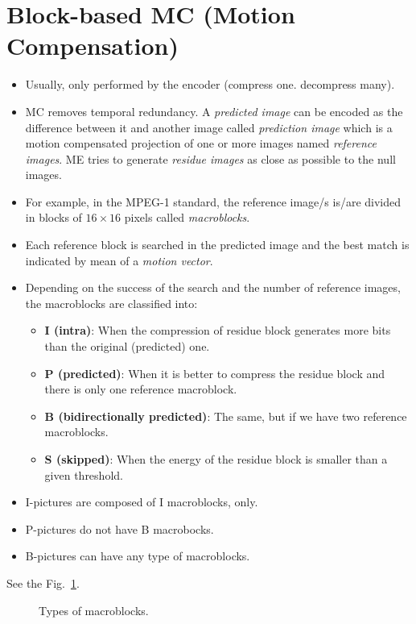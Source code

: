 \section{Block-based MC (Motion Compensation)~\cite{rao1996techniques}}
\begin{itemize}
\tightlist
\item
  Usually, only performed by the encoder (compress one. decompress
  many).
\item
  MC removes temporal redundancy. A \emph{predicted image} can be
  encoded as the difference between it and another image called
  \emph{prediction image} which is a motion compensated projection of
  one or more images named \emph{reference images}. ME tries to
  generate \emph{residue images} as close as possible to the null
  images.
\item
  For example, in the MPEG-1 standard, the reference image/s is/are
  divided in blocks of $16\times 16$ pixels called \emph{macroblocks}.
\item
  Each reference block is searched in the predicted image and the best
  match is indicated by mean of a \emph{motion vector}.
\item
  Depending on the success of the search and the number of reference
  images, the macroblocks are classified into:

  \begin{itemize}
  \tightlist
  \item
    \textbf{I (intra)}: When the compression of residue block generates
    more bits than the original (predicted) one.
  \item
    \textbf{P (predicted)}: When it is better to compress the residue
    block and there is only one reference macroblock.
  \item
    \textbf{B (bidirectionally predicted)}: The same, but if we have two
    reference macroblocks.
  \item
    \textbf{S (skipped)}: When the energy of the residue block is
    smaller than a given threshold.
  \end{itemize}
\item
  I-pictures are composed of I macroblocks, only.
\item
  P-pictures do not have B macrobocks.
\item
  B-pictures can have any type of macroblocks.
\end{itemize}
See the Fig.~\ref{fig:macroblocks}.

\begin{figure}
  \caption{Types of macroblocks.}
  \label{fig:macroblocks}
\end{figure}

